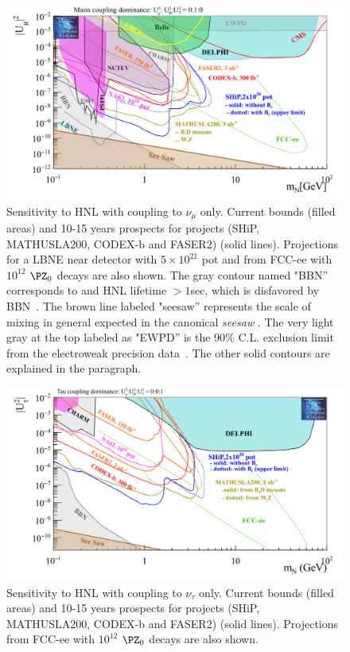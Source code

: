 \begin{figure}[h]
  \centering
  \includegraphics[width=.90\textwidth]{Figures/c3/HNL_bc7_pbc_2.png}
    \caption{Sensitivity to HNL with coupling to $\nu_\mu$ only. Current bounds (filled areas) and 10-15 years prospects for projects
(SHiP, MATHUSLA200, CODEX-b and FASER2) (solid lines). Projections for a LBNE
near detector with $5\times 10^{21}$ pot and from FCC-ee with $10^{12}$ $\PZ_0$ decays are also shown. The gray contour named "BBN'' corresponds to and HNL lifetime $>1$sec,
which is disfavored by BBN~\cite{Ruchayskiy_2012}. The brown line
labeled "seesaw'' represents the scale of mixing in general expected
in the canonical \emph{seesaw }. The very light gray at the top
labeled as "EWPD'' is the 90\% C.L. exclusion limit from the
electroweak precision data~\cite{Antusch_2015}. The other solid
contours are explained in the paragraph.}
  \label{fig:HNL_bc7_pbc_2}
\end{figure}

\begin{figure}[h]
  \centering
  \includegraphics[width=.90\textwidth]{Figures/c3/HNL_bc8_pbc_2.png}
    \caption{Sensitivity to HNL with coupling to $\nu_\tau$ only. Current bounds (filled areas) and 10-15 years prospects for projects
(SHiP, MATHUSLA200, CODEX-b and FASER2) (solid lines). Projections from FCC-ee with $10^{12}$ $\PZ_0$ decays are also shown.}
  \label{fig:HNL_bc8_pbc_2}
\end{figure}

